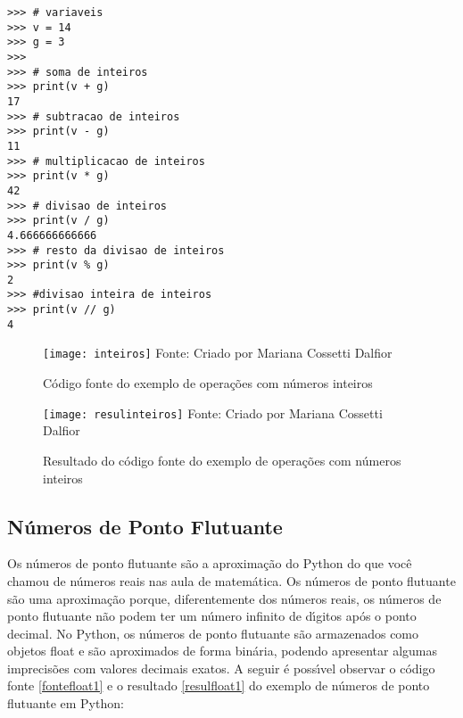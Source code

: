 \begin{lstlisting}
>>> # variaveis 
>>> v = 14
>>> g = 3
>>> 
>>> # soma de inteiros
>>> print(v + g)
17
>>> # subtracao de inteiros
>>> print(v - g) 
11
>>> # multiplicacao de inteiros
>>> print(v * g)
42
>>> # divisao de inteiros
>>> print(v / g)
4.666666666666
>>> # resto da divisao de inteiros
>>> print(v % g)
2
>>> #divisao inteira de inteiros
>>> print(v // g) 
4
\end{lstlisting}

\begin{figure}[H]
	\begin{center}
		\caption{C\'{o}digo fonte do exemplo de opera\c{c}\~{o}es com n\'{u}meros inteiros} \label{fonteinteiros}
		\texttt{[image: inteiros]} 
		\newline
		Fonte: Criado por Mariana Cossetti Dalfior
	\end{center}
\end{figure}

\begin{figure}[H]
	\begin{center}
		\caption{Resultado do c\'{o}digo fonte do exemplo de opera\c{c}\~{o}es com n\'{u}meros inteiros} \label{resulinteiros}
		\texttt{[image: resulinteiros]} 
		\newline
		Fonte: Criado por Mariana Cossetti Dalfior
	\end{center}
\end{figure}


		\subsection{N\'{u}meros de Ponto Flutuante}

Os n\'{u}meros de ponto flutuante s\~{a}o a aproxima\c{c}\~{a}o do Python do que voc\^{e} chamou de n\'{u}meros reais nas aula de matem\'{a}tica. Os n\'{u}meros de ponto flutuante s\~{a}o uma aproxima\c{c}\~{a}o porque, diferentemente dos n\'{u}meros reais, os n\'{u}meros de ponto flutuante n\~{a}o podem ter um n\'{u}mero infinito de d\'{\i}gitos ap\'{o}s o ponto decimal. No Python, os n\'{u}meros de ponto flutuante s\~{a}o armazenados como objetos float e s\~{a}o aproximados de forma bin\'{a}ria, podendo apresentar algumas imprecis\~{o}es com valores decimais exatos. A seguir \'{e} poss\'{\i}vel observar o c\'{o}digo fonte \ref{fontefloat1} e o resultado \ref{resulfloat1} do exemplo de n\'{u}meros de ponto flutuante em Python:

